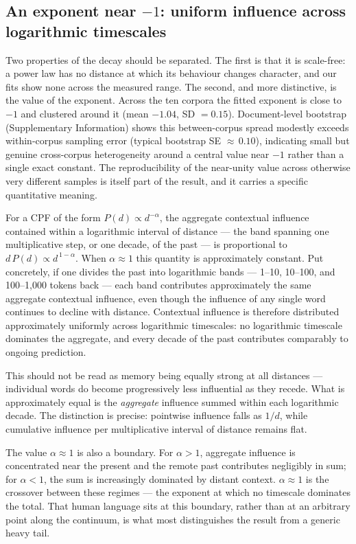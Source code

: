 \documentclass[11pt]{article}
\begin{document}
\subsection{An exponent near $-1$: uniform influence across logarithmic timescales}

Two properties of the decay should be separated. The first is that it is scale-free: a power
law has no distance at which its behaviour changes character, and our fits show none across
the measured range. The second, and more distinctive, is the value of the exponent. Across the
ten corpora the fitted exponent is close to $-1$ and clustered around it (mean $-1.04$, SD $=0.15$).
Document-level bootstrap (Supplementary Information) shows this between-corpus spread modestly
exceeds within-corpus sampling error (typical bootstrap SE ${\approx}\,0.10$), indicating small but
genuine cross-corpus heterogeneity around a central value near $-1$ rather than a single exact
constant. The reproducibility of the near-unity value across otherwise very different samples is
itself part of the result, and it carries a specific quantitative meaning.

For a CPF of the form $P(d) \propto d^{-\alpha}$, the aggregate contextual influence contained
within a logarithmic interval of distance --- the band spanning one multiplicative step, or one
decade, of the past --- is proportional to $d\,P(d) \propto d^{\,1-\alpha}$. When $\alpha \approx 1$
this quantity is approximately constant. Put concretely, if one divides the past into logarithmic
bands --- 1--10, 10--100, and 100--1{,}000 tokens back --- each band contributes approximately the
same aggregate contextual influence, even though the influence of any single word continues to
decline with distance. Contextual influence is therefore distributed approximately uniformly across
logarithmic timescales: no logarithmic timescale dominates the aggregate, and every decade of the
past contributes comparably to ongoing prediction.

This should not be read as memory being equally strong at all distances --- individual words do
become progressively less influential as they recede. What is approximately equal is the
\emph{aggregate} influence summed within each logarithmic decade. The distinction is precise:
pointwise influence falls as $1/d$, while cumulative influence per multiplicative interval of
distance remains flat.

The value $\alpha \approx 1$ is also a boundary. For $\alpha > 1$, aggregate influence is
concentrated near the present and the remote past contributes negligibly in sum; for $\alpha < 1$,
the sum is increasingly dominated by distant context. $\alpha \approx 1$ is the crossover between
these regimes --- the exponent at which no timescale dominates the total. That human language sits
at this boundary, rather than at an arbitrary point along the continuum, is what most distinguishes
the result from a generic heavy tail.
\end{document}
